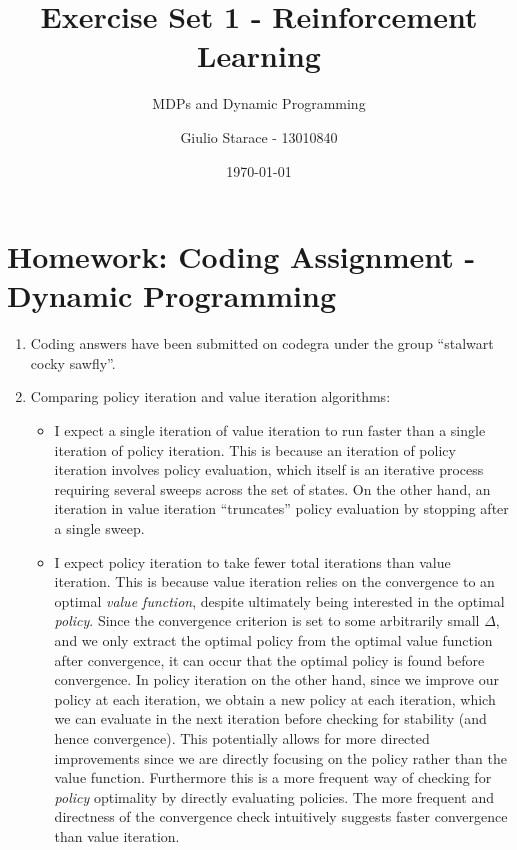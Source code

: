\documentclass[
]{article}
\title{Exercise Set 1 - Reinforcement Learning}
\subtitle{MDPs and Dynamic Programming}
\author{Giulio Starace - 13010840}
\date{\today}
\begin{document}
\maketitle

\hypertarget{homework-coding-assignment---dynamic-programming}{%
\section*{Homework: Coding Assignment - Dynamic
Programming}\label{homework-coding-assignment---dynamic-programming}}

\begin{enumerate}
\def\labelenumi{\arabic{enumi}.}
\item
  Coding answers have been submitted on codegra under the group
  ``stalwart cocky sawfly''.
\item
  Comparing policy iteration and value iteration algorithms:

  \begin{itemize}
  \item
    I expect a single iteration of value iteration to run faster than a single iteration of policy
    iteration. This is because an iteration of policy iteration involves policy evaluation, which
    itself is an iterative process requiring several sweeps across the set of states. On the other
    hand, an iteration in value iteration ``truncates'' policy evaluation by stopping after a single
    sweep.
  \item
    I expect policy iteration to take fewer total iterations than value iteration. This is because
    value iteration relies on the convergence to an optimal \textit{value function}, despite
    ultimately being interested in the optimal \textit{policy}. Since the convergence criterion is
    set to some arbitrarily small $\Delta$, and we only extract the optimal policy from the optimal
    value function after convergence, it can occur that the optimal policy is found before
    convergence. In policy iteration on the other hand, since we improve our policy at each
    iteration, we obtain a new policy at each iteration, which we can evaluate in the next iteration
    before checking for stability (and hence convergence). This potentially allows for more directed
    improvements since we are directly focusing on the policy rather than the value function.
    Furthermore this is a more frequent way of checking for \textit{policy} optimality by directly
    evaluating policies. The more frequent and directness of the convergence check intuitively
    suggests faster convergence than value iteration.
  \end{itemize} 
\end{enumerate}
\end{document}

